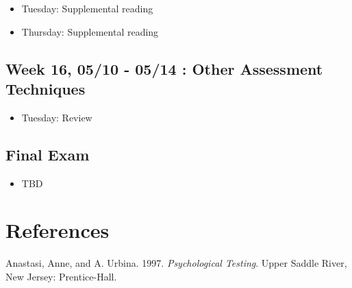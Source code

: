 \documentclass[11pt,]{article}
\providecommand{\tightlist}{%
  \setlength{\itemsep}{0pt}\setlength{\parskip}{0pt}}
\begin{document}
\begin{itemize}
\tightlist
\item
  Tuesday: Supplemental reading
\item
  Thursday: Supplemental reading
\end{itemize}

\hypertarget{week-16-0510---0514-other-assessment-techniques}{%
\subsection{Week 16, 05/10 - 05/14 : Other Assessment
Techniques}\label{week-16-0510---0514-other-assessment-techniques}}

\begin{itemize}
\tightlist
\item
  Tuesday: Review
\end{itemize}

\hypertarget{final-exam}{%
\subsection{Final Exam}\label{final-exam}}

\begin{itemize}
\tightlist
\item
  TBD
\end{itemize}

\hypertarget{references}{%
\section*{References}\label{references}}

\hypertarget{refs}{}
\leavevmode\hypertarget{ref-anastasi1997}{}%
Anastasi, Anne, and A. Urbina. 1997. \emph{Psychological Testing}. Upper
Saddle River, New Jersey: Prentice-Hall.
\end{document}
